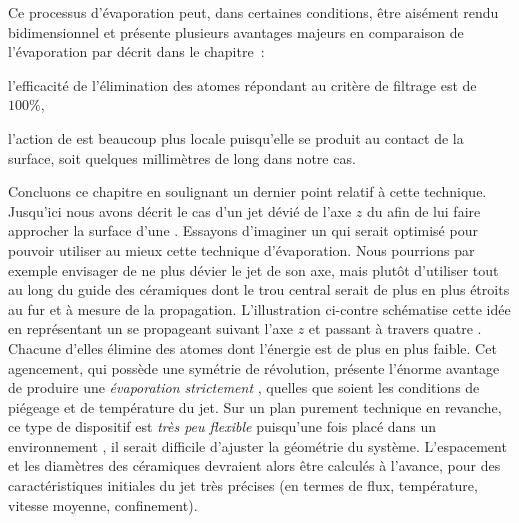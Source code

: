 
Ce processus d'évaporation peut, dans certaines conditions, être aisément rendu bidimensionnel et présente plusieurs avantages majeurs en comparaison de l'évaporation par \firf décrit dans le chapitre~:
\begin{itemizel}
	\item l'efficacité de l'élimination des atomes répondant au critère de filtrage est de $100\%$,
	\item l'action de \fisp est beaucoup plus locale puisqu'elle se produit au contact de la surface, soit quelques millimètres de long dans notre cas.
\end{itemizel}



Concluons ce chapitre en soulignant un dernier point relatif à cette technique. Jusqu'ici nous avons décrit le cas d'un jet dévié de l'axe $z$ du \gm afin de lui faire approcher la surface d'une \pdec. 
Essayons d'imaginer un \setup qui serait optimisé pour pouvoir utiliser au mieux cette technique d'évaporation. Nous pourrions par exemple envisager de ne plus dévier le jet de son axe, mais plutôt d'utiliser tout au long du guide des céramiques dont le trou central serait de plus en plus étroits au fur et à mesure de la propagation. L'illustration ci-contre schématise cette idée en représentant un \jat se propageant suivant l'axe $z$ et passant à travers quatre \pdecs. Chacune d'elles élimine des atomes dont l'énergie est de plus en plus faible. 
Cet agencement, qui possède une symétrie de révolution, présente l'énorme avantage de produire une \emph{évaporation strictement \bde}, quelles que soient les conditions de piégeage et de température du jet. 
Sur un plan purement technique en revanche, ce type de dispositif est \emph{très peu flexible} puisqu'une fois placé dans un environnement \uv, il serait difficile d'ajuster la géométrie du système. L'espacement et les diamètres des céramiques devraient alors être calculés à l'avance, pour des caractéristiques initiales du jet très précises (en termes de flux, température, vitesse moyenne, confinement). 

{\AjouteLigne}

